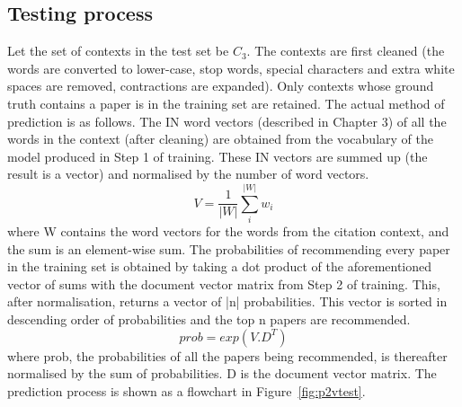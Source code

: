 \subsection{Testing process}
Let the set of contexts in the test set be $C_3$. The contexts are first cleaned (the words are converted to lower-case, stop words, special characters and extra white spaces are removed, contractions are expanded). Only contexts whose ground truth contains a paper is in the training set are retained. 
The actual method of prediction is as follows. The IN word vectors (described in Chapter 3) of all the words in the context (after cleaning) are obtained from the vocabulary of the model produced in Step 1 of training. These IN vectors are summed up (the result is a vector) and normalised by the number of word vectors. 
\begin{equation}
    V = \frac{1}{|W|} \sum\limits_{i}^{|W|} w_i
\end{equation}
where W contains the word vectors for the words from the citation context, and the sum is an element-wise sum.
The probabilities of recommending every paper in the training set is obtained by taking a dot product of the aforementioned vector of sums with the document vector matrix from Step 2 of training. This, after normalisation, returns a vector of |n| probabilities. This vector is sorted in descending order of probabilities and the top n papers are recommended.
\begin{equation}
    prob = exp(V . D^T) 
\end{equation}
where prob, the probabilities of all the papers being recommended, is thereafter normalised by the sum of probabilities. D is the document vector matrix.
The prediction process is shown as a flowchart in Figure~\ref{fig:p2vtest}.
